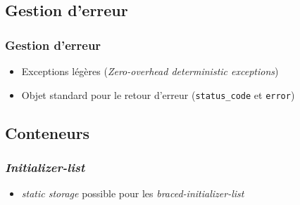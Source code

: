 \documentclass[C++.tex]{subfiles}
\begin{document}
\subsection*{Gestion d'erreur}
\begin{frame}[fragile]
	\frametitle{Gestion d'erreur}
	\begin{itemize}
		\item Exceptions légères (\textit{Zero-overhead deterministic exceptions})
		\item Objet standard pour le retour d'erreur (\lstinline|status_code| et \lstinline|error|)
	\end{itemize}
\end{frame}

\subsection*{Conteneurs}
\begin{frame}[fragile]
	\frametitle{\textit{Initializer-list}}
	\begin{itemize}
		\item \textit{static storage} possible pour les \textit{braced-initializer-list}


	\end{itemize}
\end{frame}
\end{document}
